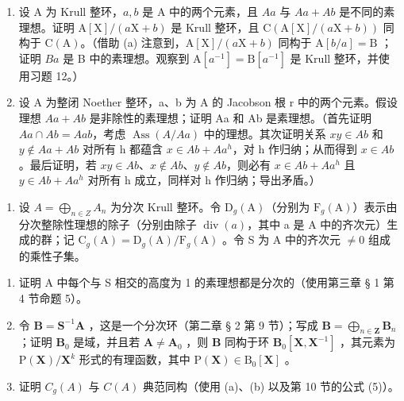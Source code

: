 \begin{enumerate}
\def\labelenumi{(\alph{enumi})}
\setcounter{enumi}{1}
\item
  设 A 为 Krull 整环，\(a, b\) 是 A 中的两个元素，且 \(Aa\) 与 \(Aa + Ab\) 是不同的素理想。证明 \(\mathrm{A}[\mathrm{X}] / (a\mathrm{X} + b)\) 是 Krull 整环，且 \(\mathrm{C}(\mathrm{A}[\mathrm{X}] / (a\mathrm{X} + b))\) 同构于 \(\mathrm{C}(\mathrm{A})\)。（借助 (a) 注意到，\(\mathrm{A}[\mathrm{X}] / (a\mathrm{X} + b)\) 同构于 \(\mathrm{A}[b / a] = \mathrm{B}\) ；证明 \(Ba\) 是 B 中的素理想。观察到 \(\mathrm{A}[a^{-1}] = \mathrm{B}[a^{-1}]\) 是 Krull 整环，并使用习题 12。）
\item
  设 A 为整闭 Noether 整环，a、b 为 A 的 Jacobson 根 r 中的两个元素。假设理想 \(Aa + Ab\) 是非除性的素理想；证明 Aa 和 Ab 是素理想。（首先证明 \(Aa \cap Ab = Aab\)，考虑 \(\operatorname{Ass}(A/Aa)\) 中的理想。其次证明关系 \(xy \in Ab\) 和 \(y \notin Aa + Ab\) 对所有 h 都蕴含 \(x \in Ab + Aa^{h}\)，对 h 作归纳；从而得到 \(x \in Ab\)。最后证明，若 \(xy \in Ab\)、\(x \notin Ab\)、\(y \notin Ab\)，则必有 \(x \in Ab + Aa^{h}\) 且 \(y \in Ab + Aa^{h}\) 对所有 h 成立，同样对 h 作归纳；导出矛盾。）
\end{enumerate}

\begin{enumerate}
\def\labelenumi{\arabic{enumi}.}
\setcounter{enumi}{15}
\tightlist
\item
  设 \(A = \bigoplus_{n \in Z} A_n\) 为分次 Krull 整环。令 \(\mathrm{D}_g(\mathrm{A})\)（分别为 \(\mathrm{F}_g(\mathrm{A})\)）表示由分次整除性理想的除子（分别由除子 \(\operatorname{div}(a)\)，其中 a 是 A 中的齐次元）生成的群；记 \(\mathrm{C}_g(\mathrm{A}) = \mathrm{D}_g(\mathrm{A}) / \mathrm{F}_g(\mathrm{A})\) 。令 S 为 A 中的齐次元 \(\neq 0\) 组成的乘性子集。
\end{enumerate}

\begin{enumerate}
\def\labelenumi{(\alph{enumi})}
\item
  证明 A 中每个与 S 相交的高度为 1 的素理想都是分次的（使用第三章 § 1 第 4 节命题 5）。
\item
  令 \(\mathbf{B} = \mathbf{S}^{-1}\mathbf{A}\) ，这是一个分次环（第二章 § 2 第 9 节）；写成 \(\mathbf{B} = \bigoplus_{n\in \mathbf{Z}}\mathbf{B}_n\) ；证明 \(\mathbf{B}_0\) 是域，并且若 \(\mathbf{A}\neq \mathbf{A}_0\) ，则 \(\mathbf{B}\) 同构于环 \(\mathbf{B}_0[\mathbf{X},\mathbf{X}^{-1}]\) ，其元素为 \(\mathrm{P}(\mathbf{X}) / \mathbf{X}^k\) 形式的有理函数，其中 \(\mathrm{P}(\mathbf{X})\in \mathrm{B}_0[\mathbf{X}]\) 。
\item
  证明 \(C_{g}(A)\) 与 \(C(A)\) 典范同构（使用 (a)、(b) 以及第 10 节的公式 (5)）。
\end{enumerate}

